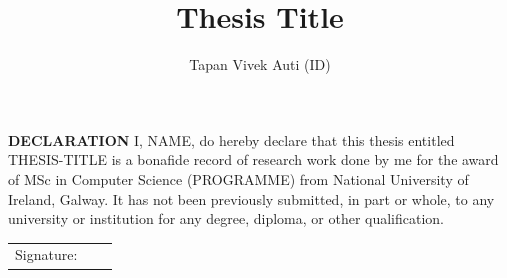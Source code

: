 \documentclass[oneside,12pt]{Classes/RoboticsLaTeX}
\title{\Large{Thesis Title}}
\author{Tapan Vivek Auti (ID)}
\begin{document}
\begin{spacing}{1}
\maketitle
\end{spacing}

\newpage\null\thispagestyle{empty}\newpage

\setcounter{secnumdepth}{3}
\setcounter{tocdepth}{3}

\frontmatter
\textbf{DECLARATION} 
I, NAME, do hereby declare that this thesis entitled THESIS-TITLE is a bonafide record of research work done by me for the award of MSc in Computer Science (PROGRAMME) from National University of Ireland, Galway. It has not been previously submitted, in part or whole, to any university or institution for any degree, diploma, or other qualification. 
\newline

\begin{tabular}{@{}p{.5in}p{4in}@{}}
Signature: & ~~\hrulefill \\
\end{tabular}
\newpage


%
%
\end{document}
